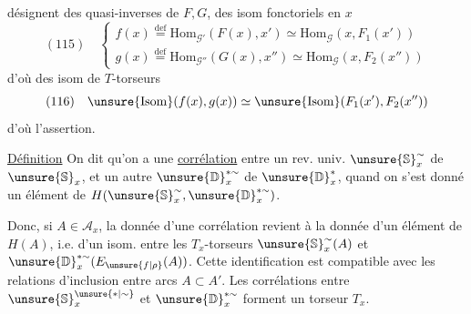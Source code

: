 désignent des quasi-inverses de $F,G$, des isom fonctoriels en $x$
\[
(115)\quad\left\{
\begin{array}{l}
f(x)\overset{\mathrm{def}}{=}\mathrm{Hom}_{\mathcal{G}'}(F(x),x')
\simeq\mathrm{Hom}_{\mathcal{G}}(x,F_1(x')) \\
g(x)\overset{\mathrm{def}}{=}\mathrm{Hom}_{\mathcal{G}''}(G(x),x'')
\simeq\mathrm{Hom}_{\mathcal{G}}(x,F_2(x''))
\end{array}\right.
\]
d'où  des isom de $T$-torseurs
\[
(116)\quad
\unsure{\mathrm{Isom}}(f(x),g(x))
\simeq\unsure{\mathrm{Isom}}(F_1(x'),F_2(x''))
\]
d'où l'assertion.



\uline{Définition} On dit qu'on a une \uline{corrélation}
entre un rev. univ. $\unsure{\mathbb{S}}_x^{\sim}$ de
$\unsure{\mathbb{S}}_x$, et un autre $\unsure{\mathbb{D}}_x^{*\sim}$
de $\unsure{\mathbb{D}}_x^*$, quand on s'est donné un élément de
$H(\unsure{\mathbb{S}}_x^{\sim},\unsure{\mathbb{D}}_x^{*\sim})$.

Donc, si $A\in\mathcal{A}_x$, la donnée d'une corrélation revient à la
donnée d'un élément de $H(A)$, i.e. d'un isom.
 entre les $T_x$-torseurs
$\unsure{\mathbb{S}}_x^{\sim}(A)$ et
$\unsure{\mathbb{D}}_x^{*\sim}(E_{\unsure{f|\rho}}(A))$.
Cette identification est compatible avec les relations d'inclusion
entre arcs $A\subset A'$.
 Les corrélations entre
$\unsure{\mathbb{S}}_x^{\unsure{*|\sim}}$ et
$\unsure{\mathbb{D}}_x^{*\sim}$ forment un torseur  $T_x$.

